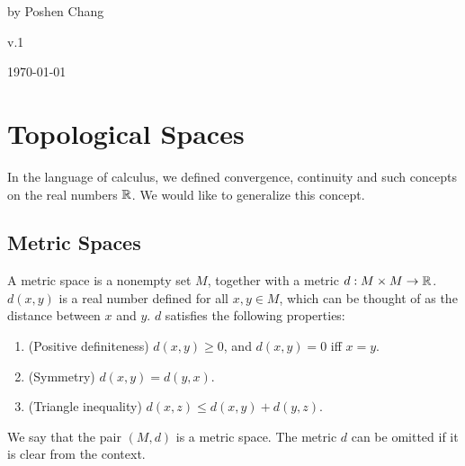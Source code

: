 \begin{titlepage}
\flushright
\vspace*{7cm}

{\garet\fontsize{48}{54}\bfseries
{} %
}

\vspace{0.2cm}
   
\vspace{2 cm}
\Large{by Poshen Chang}%

\large{v.1}%

\vspace{3.5 cm}
\Large{\today}%


\vfill
\end{titlepage}

\tableofcontents

\resetcounters
\justifying
\setlength{\parindent}{2em}




\chapter{Topological Spaces}

In the language of calculus, we defined convergence, continuity and such concepts on the real numbers ${\mathbb R}$. We would like to generalize this concept.

\section{Metric Spaces}

\begin{df}
    A metric space is a nonempty set $M$, together with a metric $d : M\times M\to {\mathbb R}$. $d(x, y)$ is a real number defined for all $x, y\in M$, which can be thought of as the distance between $x$ and $y$. $d$ satisfies the following properties:
    \begin{enumerate}[label={\alph*)}]
        \item (Positive definiteness) $d(x, y) \geq 0$, and $d(x, y) = 0$ iff $x = y$.
        \item (Symmetry) $d(x, y) = d(y, x)$.
        \item (Triangle inequality) $d(x, z) \leq d(x, y) + d(y, z)$.
    \end{enumerate}
    We say that the pair $(M, d)$ is a metric space. The metric $d$ can be omitted if it is clear from the context.
\end{df}

